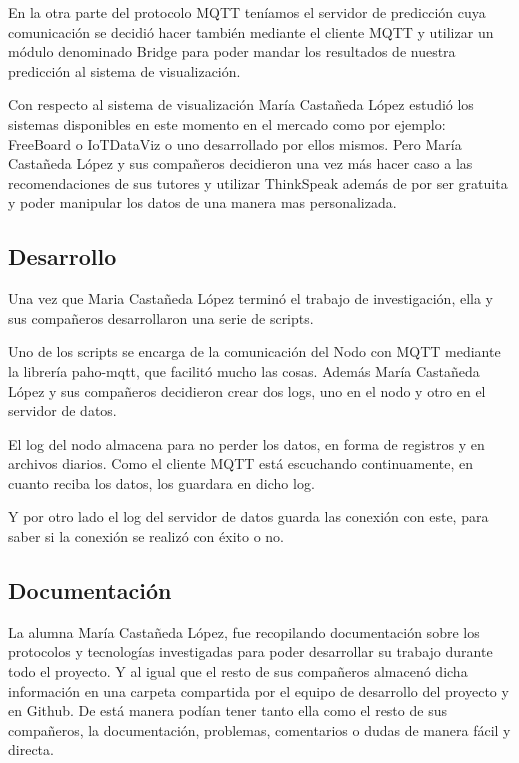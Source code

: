 En la otra parte del protocolo MQTT teníamos el servidor de predicción cuya comunicación se decidió hacer también mediante el cliente MQTT y utilizar un módulo denominado Bridge para poder mandar los resultados de nuestra predicción al sistema de visualización.

Con respecto al sistema de visualización María Castañeda López estudió los sistemas disponibles en este momento en el mercado como por ejemplo: FreeBoard o IoTDataViz o uno desarrollado por ellos mismos. Pero María Castañeda López y sus compañeros decidieron una vez más hacer caso a las recomendaciones de sus tutores y utilizar ThinkSpeak además de por ser gratuita y poder manipular los datos de una manera mas personalizada. 


\subsection{Desarrollo}

Una vez que Maria Castañeda López terminó el trabajo de investigación, ella y sus compañeros desarrollaron una serie de scripts.

Uno de los scripts se encarga de la comunicación del Nodo con MQTT mediante la librería paho-mqtt, que facilitó mucho las cosas.
Además María Castañeda López y sus compañeros decidieron crear dos logs, uno en el nodo y otro en el servidor de datos.

El log del nodo almacena para no perder los datos, en forma de registros y en archivos diarios. Como el cliente MQTT está escuchando continuamente, en cuanto reciba los datos, los guardara en dicho log.

Y por otro lado el log del servidor de datos guarda las conexión con este, para saber si la conexión se realizó con éxito o no.

\subsection{Documentación}

La alumna María Castañeda López, fue recopilando documentación sobre los protocolos y tecnologías investigadas para poder desarrollar su trabajo durante todo el proyecto. Y al igual que el resto de sus compañeros almacenó dicha información en una carpeta compartida por el equipo de desarrollo del proyecto y en Github. De está manera podían tener tanto ella como el resto de sus compañeros, la documentación, problemas, comentarios o dudas de manera fácil y directa. 

